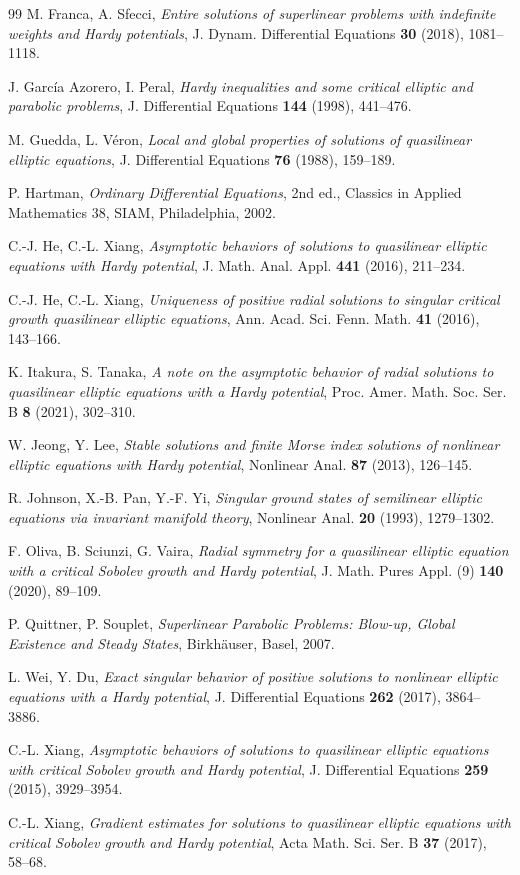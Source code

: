 \documentclass[11pt,reqno]{amsart}
\numberwithin{equation}{section}
\theoremstyle{plain}
\theoremstyle{definition}
\begin{document}
\begin{thebibliography}{99}
M. Franca, A. Sfecci,
\emph{Entire solutions of superlinear problems with indefinite weights and
Hardy potentials},
J. Dynam. Differential Equations \textbf{30} (2018), 1081--1118.

J. Garc\'ia Azorero, I. Peral,
\emph{Hardy inequalities and some critical elliptic and parabolic problems},
J. Differential Equations \textbf{144} (1998), 441--476.

M. Guedda, L. V\'eron,
\emph{Local and global properties of solutions of quasilinear elliptic
equations},
J. Differential Equations \textbf{76} (1988), 159--189.

P. Hartman,
\emph{Ordinary Differential Equations}, 2nd ed., Classics in Applied
Mathematics 38, SIAM, Philadelphia, 2002.

C.-J. He, C.-L. Xiang,
\emph{Asymptotic behaviors of solutions to quasilinear elliptic equations with
Hardy potential},
J. Math. Anal. Appl. \textbf{441} (2016), 211--234.

C.-J. He, C.-L. Xiang,
\emph{Uniqueness of positive radial solutions to singular critical growth
quasilinear elliptic equations},
Ann. Acad. Sci. Fenn. Math. \textbf{41} (2016), 143--166.

K. Itakura, S. Tanaka,
\emph{A note on the asymptotic behavior of radial solutions to quasilinear
elliptic equations with a Hardy potential},
Proc. Amer. Math. Soc. Ser. B \textbf{8} (2021), 302--310.

W. Jeong, Y. Lee,
\emph{Stable solutions and finite Morse index solutions of nonlinear elliptic
equations with Hardy potential},
Nonlinear Anal. \textbf{87} (2013), 126--145.

R. Johnson, X.-B. Pan, Y.-F. Yi,
\emph{Singular ground states of semilinear elliptic equations via invariant
manifold theory},
Nonlinear Anal. \textbf{20} (1993), 1279--1302.

F. Oliva, B. Sciunzi, G. Vaira,
\emph{Radial symmetry for a quasilinear elliptic equation with a critical
Sobolev growth and Hardy potential},
J. Math. Pures Appl. (9) \textbf{140} (2020), 89--109.

P. Quittner, P. Souplet,
\emph{Superlinear Parabolic Problems: Blow-up, Global Existence and Steady
States}, Birkh\"auser, Basel, 2007.

L. Wei, Y. Du,
\emph{Exact singular behavior of positive solutions to nonlinear elliptic
equations with a Hardy potential},
J. Differential Equations \textbf{262} (2017), 3864--3886.

C.-L. Xiang,
\emph{Asymptotic behaviors of solutions to quasilinear elliptic equations with
critical Sobolev growth and Hardy potential},
J. Differential Equations \textbf{259} (2015), 3929--3954.

C.-L. Xiang,
\emph{Gradient estimates for solutions to quasilinear elliptic equations with
critical Sobolev growth and Hardy potential},
Acta Math. Sci. Ser. B \textbf{37} (2017), 58--68.

\end{thebibliography}
\end{document}
